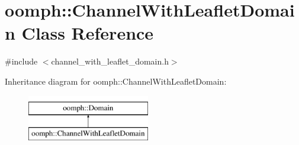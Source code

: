 \hypertarget{classoomph_1_1ChannelWithLeafletDomain}{}\section{oomph\+:\+:Channel\+With\+Leaflet\+Domain Class Reference}
\label{classoomph_1_1ChannelWithLeafletDomain}


{\ttfamily \#include $<$channel\+\_\+with\+\_\+leaflet\+\_\+domain.\+h$>$}

Inheritance diagram for oomph\+:\+:Channel\+With\+Leaflet\+Domain\+:\begin{figure}[H]
\begin{center}
\leavevmode
\includegraphics[height=2.000000cm]{classoomph_1_1ChannelWithLeafletDomain}
\end{center}
\end{figure}

